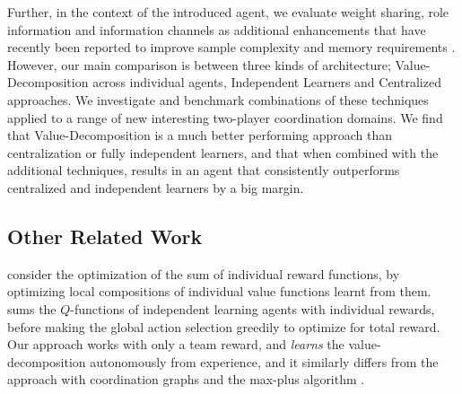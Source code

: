 \documentclass{article}
\begin{document}
Further, in the context of the introduced agent, we evaluate weight sharing, role information and information channels as additional enhancements that have recently been reported to improve sample complexity and memory requirements \citep{HausknechtThesis,FoersterCommunicate, SF16}. However, our main comparison is between three kinds of architecture; Value-Decomposition across individual agents, Independent Learners and Centralized approaches. We investigate and benchmark combinations of these techniques applied to a range of new interesting two-player coordination domains. We find that Value-Decomposition is a much better performing approach than centralization or fully independent learners, and that when combined with the additional techniques, results in an agent that consistently outperforms centralized and independent learners by a big margin.





\iffalse
These architectures bring us to a further point about homogeneous approaches.
Besides the obvious homogeneous approach of identical fully individual agents, we see that there is a larger class of options satisfying an agent-invariance property that we introduce here. These can be seen as less naive and more sparsely connected centralized architectures. Though these are able to succeed where the more naively centralized agents fail, it is an important point that our value-decomposition method can train successfully coordinated individual agents.
\fi





\subsection{Other Related Work}

\citet{SchneiderDistributed} consider the optimization of the sum of individual reward functions, by optimizing local compositions of individual value functions learnt from them. \citet{RussellZimdarsQDecomposition} sums the $Q$-functions of independent learning agents with individual rewards, before making the global action selection greedily to optimize for total reward. Our approach works with only a team reward, and \emph{learns} the value-decomposition autonomously from experience, and it similarly differs from the approach with coordination graphs \citep{Guestrin2002} and the max-plus algorithm \citep{KuyerWBV08,Pol16}.
\end{document}
